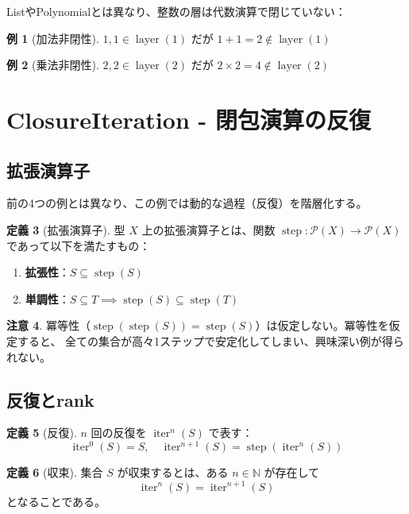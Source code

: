 \documentclass[a4paper,11pt]{ltjsarticle}
\theoremstyle{definition}
\newtheorem{definition}{定義}[section]
\newtheorem{example}[definition]{例}
\newtheorem{remark}[definition]{注意}
\newcommand{\layer}{\operatorname{layer}}
\newcommand{\step}{\operatorname{step}}
\newcommand{\iter}{\operatorname{iter}}
\begin{document}
ListやPolynomialとは異なり、整数の層は代数演算で閉じていない：

\begin{example}[加法非閉性]
$1, 1 \in \layer(1)$ だが $1 + 1 = 2 \notin \layer(1)$
\end{example}

\begin{example}[乗法非閉性]
$2, 2 \in \layer(2)$ だが $2 \times 2 = 4 \notin \layer(2)$
\end{example}

\section{ClosureIteration - 閉包演算の反復}
\label{sec:closure}

\subsection{拡張演算子}

前の4つの例とは異なり、この例では動的な過程（反復）を階層化する。

\begin{definition}[拡張演算子]
型 $X$ 上の拡張演算子とは、関数 $\step : \mathcal{P}(X) \to \mathcal{P}(X)$ であって以下を満たすもの：
\begin{enumerate}
\item \textbf{拡張性}：$S \subseteq \step(S)$
\item \textbf{単調性}：$S \subseteq T \implies \step(S) \subseteq \step(T)$
\end{enumerate}
\end{definition}

\begin{remark}
冪等性（$\step(\step(S)) = \step(S)$）は仮定しない。冪等性を仮定すると、
全ての集合が高々1ステップで安定化してしまい、興味深い例が得られない。
\end{remark}

\subsection{反復とrank}

\begin{definition}[反復]
$n$ 回の反復を $\iter^n(S)$ で表す：
\[
\iter^0(S) = S, \quad \iter^{n+1}(S) = \step(\iter^n(S))
\]
\end{definition}

\begin{definition}[収束]
集合 $S$ が収束するとは、ある $n \in \mathbb{N}$ が存在して
\[
\iter^n(S) = \iter^{n+1}(S)
\]
となることである。
\end{definition}
\end{document}
